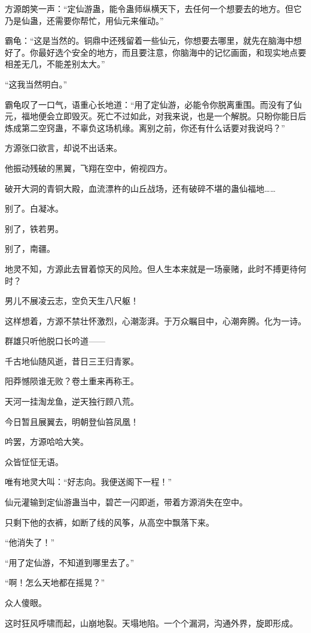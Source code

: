 \begin{this_body}
方源朗笑一声：“定仙游蛊，能令蛊师纵横天下，去任何一个想要去的地方。但它乃是仙蛊，还需要你帮忙，用仙元来催动。”

霸龟：“这是当然的。铜鼎中还残留着一些仙元，你想要去哪里，就先在脑海中想好了。你最好选个安全的地方，而且要注意，你脑海中的记忆画面，和现实地点要相差无几，不能差别太大。”

“这我当然明白。”

霸龟叹了一口气，语重心长地道：“用了定仙游，必能令你脱离重围。而没有了仙元，福地便会立即毁灭。死亡不过如此，对我来说，也是一个解脱。只盼你能日后炼成第二空窍蛊，不辜负这场机缘。离别之前，你还有什么话要对我说吗？”

方源张口欲言，却说不出话来。

他振动残破的黑翼，飞翔在空中，俯视四方。

破开大洞的青铜大殿，血流漂杵的山丘战场，还有破碎不堪的蛊仙福地……

别了。白凝冰。

别了，铁若男。

别了，南疆。

地灵不知，方源此去冒着惊天的风险。但人生本来就是一场豪赌，此时不搏更待何时？

男儿不展凌云志，空负天生八尺躯！

这样想着，方源不禁壮怀激烈，心潮澎湃。于万众瞩目中，心潮奔腾。化为一诗。

群雄只听他脱口长吟道——

千古地仙随风逝，昔日三王归青冢。

阳莽憾陨谁无败？卷土重来再称王。

天河一挂淘龙鱼，逆天独行顾八荒。

今日暂且展翼去，明朝登仙笞凤凰！

吟罢，方源哈哈大笑。

众皆怔怔无语。

唯有地灵大叫：“好志向。我便送阁下一程！”

仙元灌输到定仙游蛊当中，碧芒一闪即逝，带着方源消失在空中。

只剩下他的衣裤，如断了线的风筝，从高空中飘落下来。

“他消失了！”

“用了定仙游，不知道到哪里去了。”

“啊！怎么天地都在摇晃？”

众人傻眼。

这时狂风呼啸而起，山崩地裂。天塌地陷。一个个漏洞，沟通外界，旋即形成。


\end{this_body}

